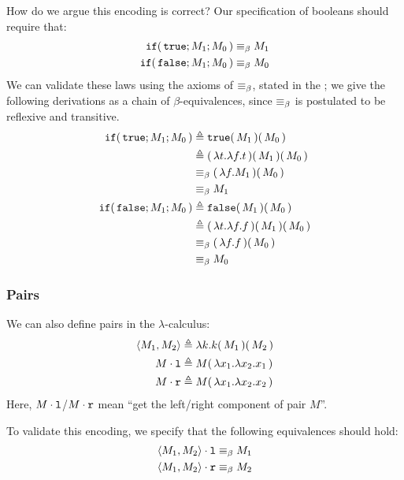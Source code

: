 \documentclass[11pt]{article}
\begin{document}
How do we argue this encoding is correct?
Our specification of booleans should require that:
\begin{align*}
  \ifexabt{\trexabt}{M_1}{M_0} &\betaequiv M_1 \\
  \ifexabt{\faexabt}{M_1}{M_0} &\betaequiv M_0
\end{align*}
We can validate these laws using the axioms of $\betaequiv$, stated in the \Supplement; we give the following derivations as a chain of $\beta$-equivalences, since $\betaequiv$ is postulated to be reflexive and transitive.
\begin{align*}
  \ifexabt{\trexabt}{M_1}{M_0}
    &\isdef \uappcst{\uappcst{\trexabt}{M_1}}{M_0} \\
    &\isdef \uappcst{\uappcst{\cdparens{\ulamcst{t}{\ulamcst{f}{t}}}}{M_1}}{M_0} \\
    &\betaequiv \uappcst{\cdparens{\ulamcst{f}{M_1}}}{M_0} \\
    &\betaequiv M_1 \\
  \ifexabt{\faexabt}{M_1}{M_0}
    &\isdef \uappcst{\uappcst{\faexabt}{M_1}}{M_0} \\
    &\isdef \uappcst{\uappcst{\cdparens{\ulamcst{t}{\ulamcst{f}{f}}}}{M_1}}{M_0} \\
    &\betaequiv \uappcst{\cdparens{\ulamcst{f}{f}}}{M_0} \\
    &\betaequiv M_0
\end{align*}

\subsubsection{Pairs}

We can also define pairs in the $\lambda$-calculus:
\begin{align*}
  \pairexcst{M_1}{M_2} &\isdef \ulamcst{k}{\uappcst{\uappcst{k}{M_1}}{M_2}} \\
  \fstexcst{M}         &\isdef \uappcst{M}{\ulamcst{x_1}{\ulamcst{x_2}{x_1}}} \\
  \sndexcst{M}         &\isdef \uappcst{M}{\ulamcst{x_1}{\ulamcst{x_2}{x_2}}}
\end{align*}
Here, $\fstexcst{M}$/$\sndexcst{M}$ mean ``get the left/right component of pair $M$''.

To validate this encoding, we specify that the following equivalences should hold:
\begin{align*}
  \fstexcst{\pairexcst{M_1}{M_2}} &\betaequiv M_1 \\
  \sndexcst{\pairexcst{M_1}{M_2}} &\betaequiv M_2
\end{align*}
\end{document}
